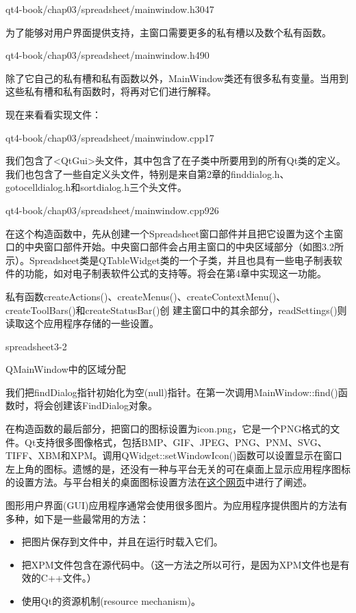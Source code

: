 \documentclass[11pt,oneside]{book}
\begin{document}
\begin{common-format}
\begin{cppline}{qt4-book/chap03/spreadsheet/mainwindow.h}{30}{47}
\end{cppline}

为了能够对用户界面提供支持，主窗口需要更多的私有槽以及数个私有函数。
\begin{cppline}{qt4-book/chap03/spreadsheet/mainwindow.h}{49}{0}
\end{cppline}

除了它自己的私有槽和私有函数以外，MainWindow类还有很多私有变量。当用到这些私有槽和私有函数时，将再对它们进行解释。

现在来看看实现文件：
\begin{cppline}{qt4-book/chap03/spreadsheet/mainwindow.cpp}{1}{7}
\end{cppline}

我们包含了<QtGui>头文件，其中包含了在子类中所要用到的所有Qt类的定义。我们也包含了一些自定义头文件，特别是来自第2章的finddialog.h、gotocelldialog.h和sortdialog.h三个头文件。
\begin{cppline}{qt4-book/chap03/spreadsheet/mainwindow.cpp}{9}{26}
\end{cppline}

在这个构造函数中，先从创建一个Spreadsheet窗口部件并且把它设置为这个主窗口的中央窗口部件开始。中央窗口部件会占用主窗口的中央区域部分（如图3.2所示）。Spreadsheet类是QTableWidget类的一个子类，并且也具有一些电子制表软件的功能，如对电子制表软件公式的支持等。将会在第4章中实现这一功能。

私有函数createActions()、createMenus()、createContextMenu()、createToolBars()和createStatusBar()创
建主窗口中的其余部分，readSettings()则读取这个应用程序存储的一些设置。
\begin{linefig}[0.8]{spreadsheet3-2}
\caption{QMainWindow中的区域分配}
\label{fig:spreadsheet3-2}
\end{linefig}

我们把findDialog指针初始化为空(null)指针。在第一次调用MainWindow::find()函数时，将会创建该FindDialog对象。

在构造函数的最后部分，把窗口的图标设置为icon.png，它是一个PNG格式的文件。Qt支持很多图像格式，包括BMP、GIF、JPEG、PNG、PNM、SVG、TIFF、XBM和XPM。调用QWidget::setWindowIcon()函数可以设置显示在窗口左上角的图标。遗憾的是，还没有一种与平台无关的可在桌面上显示应用程序图标的设置方法。与平台相关的桌面图标设置方法在\href{http://doc.trolltech.com/4.3/appicon.html}{这个网页}中进行了阐述。


图形用户界面(GUI)应用程序通常会使用很多图片。为应用程序提供图片的方法有多种，如下是一些最常用的方法：
\begin{itemize}
\item 把图片保存到文件中，并且在运行时载入它们。
\item 把XPM文件包含在源代码中。（这一方法之所以可行，是因为XPM文件也是有效的C++文件。）
\item 使用Qt的资源机制(resource mechanism)。
\end{itemize}


\end{common-format}
\end{document}
